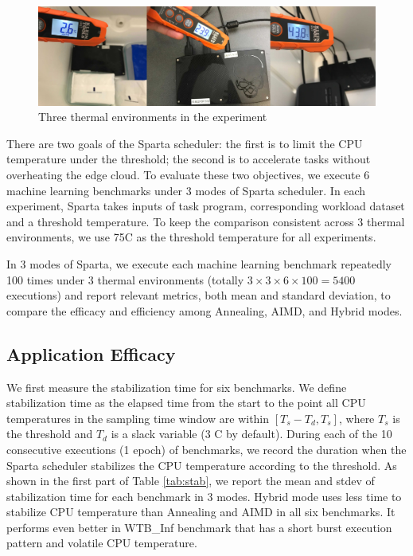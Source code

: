 \begin{figure}
\includegraphics[width=\textwidth]{figures/thermal.jpg}
\caption{Three thermal environments in the experiment} \label{cold}
\end{figure}

There are two goals of the Sparta scheduler: the first is to limit the CPU temperature under the threshold; the second is to accelerate tasks without overheating the edge cloud. To evaluate these two objectives, we execute 6 machine learning benchmarks under 3 modes of Sparta scheduler. In each experiment, Sparta takes inputs of task program, corresponding workload dataset and a threshold temperature. To keep the comparison consistent across 3 thermal environments, we use 75\degree C as the threshold temperature for all experiments.

In 3 modes of Sparta, we execute each machine learning benchmark repeatedly 100 times under 3 thermal environments (totally $3 \times 3 \times 6 \times 100 = 5400$ executions) and report relevant metrics, both mean and standard deviation, to compare the efficacy and efficiency among Annealing, AIMD, and Hybrid modes.


\subsection{Application Efficacy}

We first measure the stabilization time for six benchmarks. We define stabilization time as the elapsed time from the start to the point all CPU temperatures in the sampling time window are within $[T_s - T_d, T_s]$, where $T_s$ is the threshold and $T_d$ is a slack variable (3 \degree C by default). During each of the 10 consecutive executions (1 epoch) of benchmarks, we record the duration when the Sparta scheduler stabilizes the CPU temperature according to the threshold. As shown in the first part of Table \ref{tab:stab}, we report the mean and stdev of stabilization time for each benchmark in 3 modes. Hybrid mode uses less time to stabilize CPU temperature than Annealing and AIMD in all six benchmarks. It performs even better in WTB\_Inf benchmark that has a short burst execution pattern and volatile CPU temperature.

